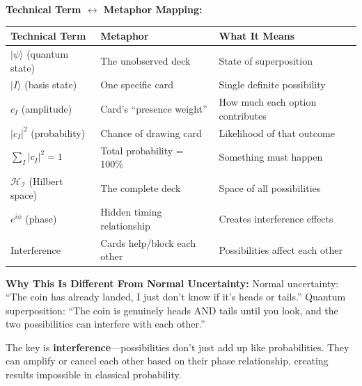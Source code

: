 \documentclass[11pt,twoside]{book}
\newcommand{\Ideas}{\mathcal{I}}
\begin{document}
\begin{tcolorbox}[colback=green!5!white,colframe=green!65!black,title=\textbf{Plain English: What is Quantum Superposition of Ideas?},breakable]
\textbf{Technical Term $\leftrightarrow$ Metaphor Mapping:}
\begin{center}
\footnotesize
\begin{tabularx}{\textwidth}{>{\raggedright\arraybackslash}X|>{\raggedright\arraybackslash}X|>{\raggedright\arraybackslash}X}
\toprule
\textbf{Technical Term} & \textbf{Metaphor} & \textbf{What It Means} \\
\midrule
$|\psi\rangle$ (quantum state) & The unobserved deck & State of superposition \\
$|I\rangle$ (basis state) & One specific card & Single definite possibility \\
$c_I$ (amplitude) & Card's ``presence weight'' & How much each option contributes \\
$|c_I|^2$ (probability) & Chance of drawing card & Likelihood of that outcome \\
$\sum_I |c_I|^2 = 1$ & Total probability = 100\% & Something must happen \\
$\mathcal{H}_{\Ideas}$ (Hilbert space) & The complete deck & Space of all possibilities \\
$e^{i\phi}$ (phase) & Hidden timing relationship & Creates interference effects \\
Interference & Cards help/block each other & Possibilities affect each other \\
\bottomrule
\end{tabularx}
\end{center}

\textbf{Why This Is Different From Normal Uncertainty:}
Normal uncertainty: ``The coin has already landed, I just don't know if it's heads or tails.''
Quantum superposition: ``The coin is genuinely heads AND tails until you look, and the two possibilities can interfere with each other.''

The key is \textbf{interference}---possibilities don't just add up like probabilities. They can amplify or cancel each other based on their phase relationship, creating results impossible in classical probability.

\end{tcolorbox}
\end{document}

